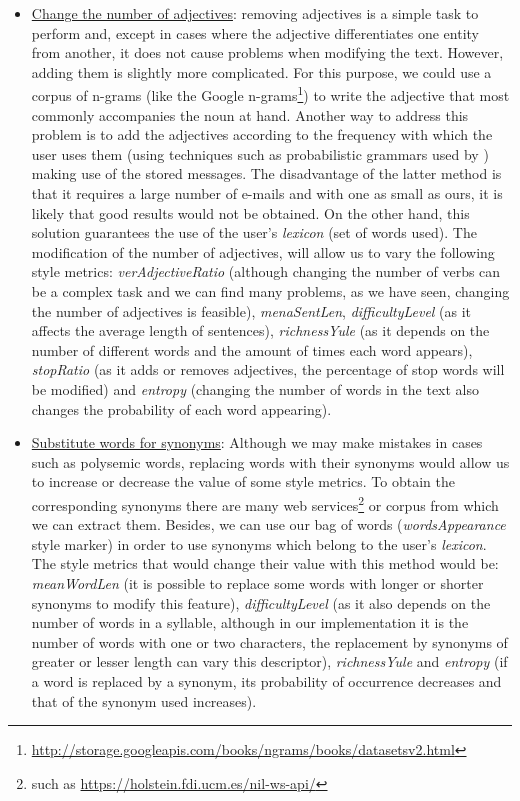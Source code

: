 \begin{itemize}
	\item \underline{Change the number of adjectives}: removing adjectives is a simple task to perform and, except in cases where the adjective differentiates one entity from another, it does not cause problems when modifying the text. However, adding them is slightly more complicated. For this purpose, we could use a corpus of n-grams (like the Google n-grams\footnote{\url{http://storage.googleapis.com/books/ngrams/books/datasetsv2.html}}) to write the adjective that most commonly accompanies the noun at hand. Another way to address this problem is to add the adjectives according to the frequency with which the user uses them (using techniques such as probabilistic grammars used by \cite{halliday2014corpus}) making use of the stored messages. The disadvantage of the latter method is that it requires a large number of e-mails and with one as small as ours, it is likely that good results would not be obtained. On the other hand, this solution guarantees the use of the user's \textit{lexicon} (set of words used). The modification of the number of adjectives, will allow us to vary the following style metrics: \textit{verAdjectiveRatio} (although changing the number of verbs can be a complex task and we can find many problems, as we have seen, changing the number of adjectives is feasible), \textit{menaSentLen}, \textit{difficultyLevel} (as it affects the average length of sentences), \textit{richnessYule} (as it depends on the number of different words and the amount of times each word appears), \textit{stopRatio} (as it adds or removes adjectives, the percentage of stop words will be modified) and \textit{entropy} (changing the number of words in the text also changes the probability of each word appearing).
	
	\item\underline{Substitute words for synonyms}: Although we may make mistakes in cases such as polysemic words, replacing words with their synonyms would allow us to increase or decrease the value of some style metrics. To obtain the corresponding synonyms there are many web services\footnote{such as \url{https://holstein.fdi.ucm.es/nil-ws-api/}} or corpus from which we can extract them. Besides, we can use our bag of words (\textit{wordsAppearance} style marker) in order to use synonyms which belong to the user's \textit{lexicon}. The style metrics that would change their value with this method would be: \textit{meanWordLen} (it is possible to replace some words with longer or shorter synonyms to modify this feature), \textit{difficultyLevel} (as it also depends on the number of words in a syllable, although in our implementation it is the number of words with one or two characters, the replacement by synonyms of greater or lesser length can vary this descriptor), \textit{richnessYule} and \textit{entropy} (if a word is replaced by a synonym, its probability of occurrence decreases and that of the synonym used increases).
	

\end{itemize}
